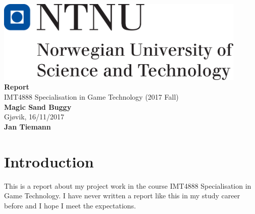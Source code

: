 \documentclass[12pt,a4paper,twoside,titlepage,headsepline,numbers=noenddot,listof=totoc,index=totoc,bibliography=totoc]{scrartcl}
\theoremstyle{break}
\begin{document}
                


\setcounter{page}{1}

\begin{titlepage}
\thispagestyle{empty}
\begin{center}

		\includegraphics[width=12cm]{figures/uni-logo}\\
                     
  \vspace{4cm}
		{\LARGE  \textbf{Report}} \\ 
		\vspace{0.5cm}
		{\Large IMT4888 Specialisation in Game Technology (2017 Fall) } \\ 
		\vspace{1.5cm}
		{\Large\textbf{Magic Sand Buggy}} \\
		\vspace{0.5cm}
		Gjøvik, 16/11/2017 \\
		\vspace{2cm}
		\textbf{Jan Tiemann} 			
\end{center}
\end{titlepage}

\clearpage
	



\setcounter{page}{1}


\tableofcontents
\newpage

\section{Introduction}
This is a report about my project work in the course IMT4888 Specialisation in Game Technology. I have never written a report like this in my study career before and I hope I meet the expectations. 
\end{document}
